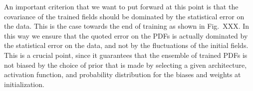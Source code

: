An important criterion that we want to put forward at this point is that the
covariance of the trained fields should be dominated by the statistical error on
the data. This is the case towards the end of training as shown in Fig.~XXX. In
this way we ensure that the quoted error on the PDFs is actually dominated by
the statistical error on the data, and not by the fluctuations of the initial
fields. This is a crucial point, since it guarantees that the ensemble of
trained PDFs is not biased by the choice of prior that is made by selecting a
given architecture, activation function, and probability distribution for the
biases and weights at initialization. 

\FloatBarrier
